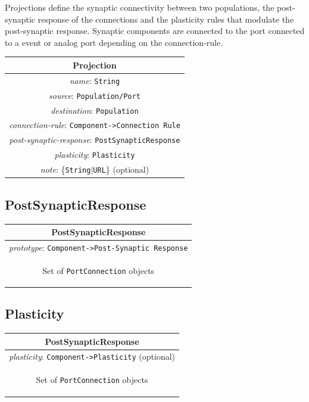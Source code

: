 \documentclass[draftspec]{ninemlspec}
\begin{document}
Projections define the synaptic connectivity between two populations, the post-synaptic response of the connections and the plasticity rules that modulate the post-synaptic response. Synaptic components are connected to the port  connected to a event or analog port depending on the connection-rule.

\begin{table}[htb]
\center
\begin{tabular}{|c|}
\hline
\hline
Projection \\
\hline
\hline
{\em name}: {\tt String} \\
\hline
{\em source}: {\tt Population/Port} \\
\hline
{\em destination}: {\tt Population} \\
\hline
{\em connection-rule}: {\tt Component->Connection Rule} \\
\hline
{\em post-synaptic-response}: {\tt PostSynapticResponse} \\
\hline
{\em plasticity}: {\tt Plasticity} \\
\hline
{\em note}: \{{\tt String}$|${\tt URL}\} (optional)\\
\hline
\end{tabular}
\end{table}

\subsection{PostSynapticResponse}
\label{postsynapticresponse}

\begin{table}[htb]
\center
\begin{tabular}{|c|}
\hline
\hline
PostSynapticResponse \\
\hline
\hline
{\em prototype}: {\tt Component->Post-Synaptic Response} \\
\hline
\colorbox{issuecolor}{\parbox{0.4\linewidth}
{\center Set of {\tt PortConnection} objects}} \\
\hline
\end{tabular}
\end{table}


\subsection{Plasticity}
\label{plasticity}

\begin{table}[htb]
\center
\begin{tabular}{|c|}
\hline
\hline
PostSynapticResponse \\
\hline
\hline
{\em plasticity}: {\tt Component->Plasticity} (optional) \\
\hline
\colorbox{issuecolor}{\parbox{0.4\linewidth}
{\center Set of {\tt PortConnection} objects}} \\
\hline
\end{tabular}
\end{table}
\end{document}
